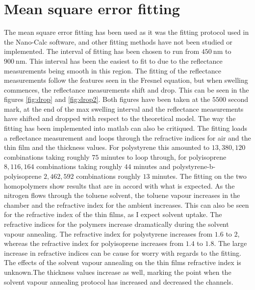 \documentclass[MasterThesisMain.tex]{subfiles}
\begin{document}
\section{Mean square error fitting}
The mean square error fitting has been used as it was the fitting protocol used in the Nano-Calc software, and other fitting methods have not been studied or implemented. The interval of fitting has been chosen to run from $\SI{450}{\nano\meter}$ to $\SI{900}{\nano\meter}$. This interval has been the easiest to fit to due to the reflectance measurements being smooth in this region. The fitting of the reflectance measurements follow the features seen in the Fresnel equation, but when swelling commences, the reflectance measurements shift and drop. This can be seen in the figures \ref{fig:drop} and \ref{fig:drop2}. Both figures have been taken at the $5500$ second mark, at the end of the max swelling interval and the reflectance measurements have shifted and dropped with respect to the theoretical model. The way the fitting has been implemented into matlab can also be critiqued. The fitting loads a reflectance measurement and loops through the refractive indices for air and the thin film and the thickness values. For polystyrene this amounted to $13,380,120$ combinations taking roughly $75$ minutes to loop through, for polyisoprene $8,116,164$ combinations taking roughly $44$ minutes and polystyrene-b-polyisoprene $2,462,592$ combinations roughly $13$ minutes. The fitting on the two homopolymers show results that are in accord with what is expected. As the nitrogen flows through the toluene solvent, the toluene vapour increases in the chamber and the refractive index for the ambient increases. This can also be seen for the refractive index of the thin films, as I expect solvent uptake. The refractive indices for the polymers increase dramatically during the solvent vapour annealing. The refractive index for polystyrene increases from $1.6$ to $2$, whereas the refractive index for polyisoprene increases from $1.4$ to $1.8$. The large increase in refractive indices can be cause for worry with regards to the fitting. The effects of the solvent vapour annealing on the thin films refractive index is unknown.The thickness values increase as well, marking the point when the solvent vapour annealing protocol has increased and decreased the channels. 
\end{document}
